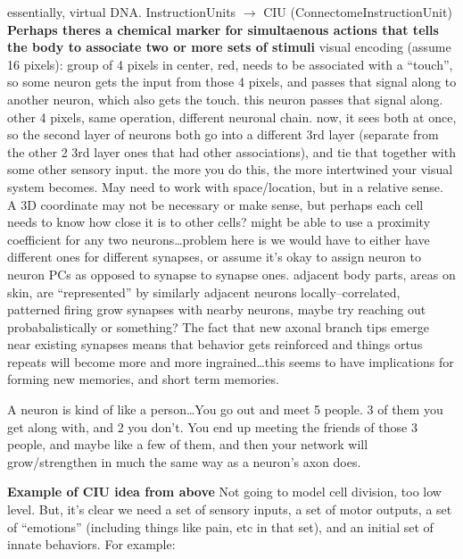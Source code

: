 \documentclass[11pt, a4paper, oneside]{article}   	%
\begin{document}
\begin{outline}
    \subpoint essentially, virtual DNA.
        \subsubpoint InstructionUnits $\rightarrow$ CIU (ConnectomeInstructionUnit)
  \point \textbf{Perhaps theres a chemical marker for simultaenous actions that tells the body to associate two or more sets of stimuli}
  \point visual encoding (assume 16 pixels):
    \subpoint group of 4 pixels in center, red, needs to be associated with a ``touch'', so some neuron gets the input from those 4 pixels, and passes that signal along to another neuron, which also gets the touch. this neuron passes that signal along.
    \subpoint other 4 pixels, same operation, different neuronal chain.
    \subpoint now, it sees both at once, so the second layer of neurons both go into a different 3rd layer (separate from the other 2 3rd layer ones that had other associations), and tie that together with some other sensory input.
    \subpoint the more you do this, the more intertwined your visual system becomes.
\point May need to work with space/location, but in a relative sense. A 3D coordinate may not be necessary or make sense, but perhaps each cell needs to know how close it is to other cells?
    \subpoint might be able to use a proximity coefficient for any two neurons\ldots problem here is we would have to either have different ones for different synapses, or assume it's okay to assign neuron to neuron PCs as opposed to synapse to synapse ones.
    \subpoint adjacent body parts, areas on skin, are ``represented'' by similarly adjacent neurons
\point locally--correlated, patterned firing 
\point grow synapses with nearby neurons, maybe try reaching out probabalistically or something?
\point The fact that new axonal branch tips emerge near existing synapses means that behavior gets reinforced and things ortus repeats will become more and more ingrained\ldots this seems to have implications for forming new memories, and short term memories.
\end{outline}

A neuron is kind of like a person\ldots You go out and meet 5 people. 3 of them you get along with, and 2 you don't. You end up meeting the friends of those 3 people, and maybe like a few of them, and then your network will grow/strengthen in much the same way as a neuron's axon does.

\textbf{Example of CIU idea from above}
Not going to model cell division, too low level. But, it's clear we need a set of sensory inputs, a set of motor outputs, a set of ``emotions'' (including things like pain, etc in that set), and an initial set of innate behaviors. For example:
\end{document}
